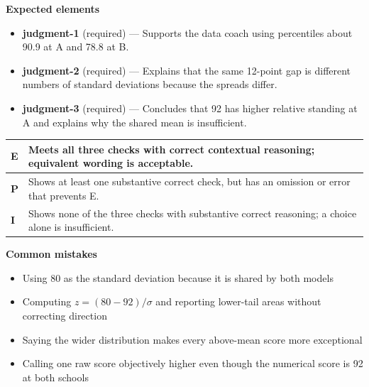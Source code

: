 \documentclass[11pt]{article}
\begin{document}

\textbf{Expected elements}
\begin{itemize}[leftmargin=1.5em,itemsep=2pt,topsep=2pt]
  \item \textbf{judgment-1} (required) --- Supports the data coach using percentiles about 90.9 at A and 78.8 at B.
  \item \textbf{judgment-2} (required) --- Explains that the same 12-point gap is different numbers of standard deviations because the spreads differ.
  \item \textbf{judgment-3} (required) --- Concludes that 92 has higher relative standing at A and explains why the shared mean is insufficient.
\end{itemize}

{\small\renewcommand{\arraystretch}{1.25}
\noindent\begin{tabular}{|p{0.5in}|p{5.9in}|}
\hline
\textbf{E} & Meets all three checks with correct contextual reasoning; equivalent wording is acceptable. \\ \hline
\textbf{P} & Shows at least one substantive correct check, but has an omission or error that prevents E. \\ \hline
\textbf{I} & Shows none of the three checks with substantive correct reasoning; a choice alone is insufficient. \\ \hline
\end{tabular}}

\textbf{Common mistakes}
\begin{itemize}[leftmargin=1.5em,itemsep=2pt,topsep=2pt]
  \item Using 80 as the standard deviation because it is shared by both models
  \item Computing $z=(80-92)/\sigma$ and reporting lower-tail areas without correcting direction
  \item Saying the wider distribution makes every above-mean score more exceptional
  \item Calling one raw score objectively higher even though the numerical score is 92 at both schools
\end{itemize}

\clearpage
{}
\end{document}
